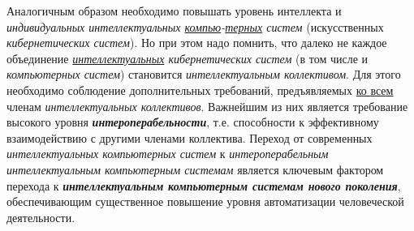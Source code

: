 Аналогичным образом необходимо повышать уровень интеллекта и \textit{индивидуальных интеллектуальных \underline{компью}-\underline{терных} систем} (искусственных \textit{кибернетических систем}). Но при этом надо помнить, что далеко не каждое объединение \textit{\underline{интеллектуальных} кибернетических систем} (в том числе и \textit{компьютерных систем}) становится \textit{интеллектуальным коллективом}. Для этого необходимо соблюдение дополнительных требований, предъявляемых \underline{ко всем} членам \textit{интеллектуальных коллективов}. Важнейшим из них является требование высокого уровня \textbf{\textit{интероперабельности}}, т.е. способности к эффективному взаимодействию с другими членами коллектива. Переход от современных \textit{интеллектуальных компьютерных систем} к \textit{интероперабельным интеллектуальным компьютерным системам} является ключевым фактором перехода к \textbf{\textit{интеллектуальным компьютерным системам нового поколения}}, обеспечивающим существенное повышение уровня автоматизации человеческой деятельности.


